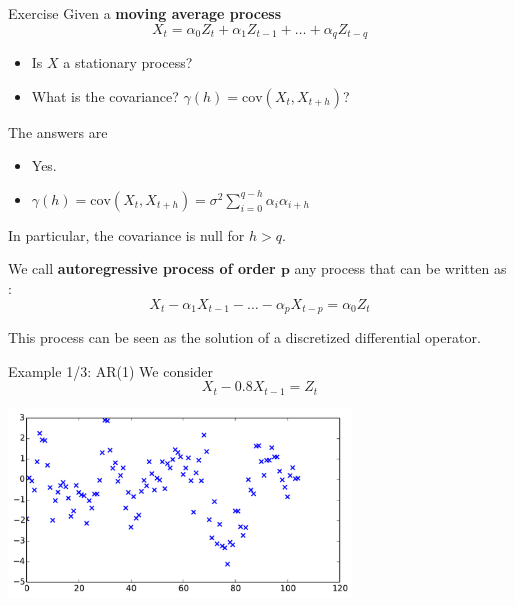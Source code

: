 \documentclass{beamer}
\begin{document}
\begin{frame}{}
\begin{exampleblock}{Exercise}
Given a \textbf{moving average process} 
\begin{equation*}
X_t  = \alpha_0 Z_{t} + \alpha_1 Z_{t-1} + \dots + \alpha_q Z_{t-q}
\end{equation*}
\begin{itemize}
	\item Is $X$ a stationary process?
	\item What is the covariance? $\gamma(h) = \mathrm{cov}(X_t,X_{t+h})$?
\end{itemize}
\end{exampleblock}
\pause
The answers are
\begin{itemize}
	\item Yes.
	\item $\gamma(h) = \mathrm{cov}(X_t,X_{t+h}) = \sigma^2 \sum_{i=0}^{q-h} \alpha_i \alpha_{i+h}$
\end{itemize}
\vspace{2mm}
In particular, the covariance is null for $h>q$.
\end{frame}

\begin{frame}{}
\begin{definition}
We call \textbf{autoregressive process of order $\mathbf{p}$} any process that can be written as :
\begin{equation*}
 X_t - \alpha_1 X_{t-1} - \dots - \alpha_p X_{t-p} = \alpha_0 Z_{t} 
\end{equation*}
\end{definition}
This process can be seen as the solution of a discretized differential operator.
\end{frame}

\begin{frame}{}
\begin{exampleblock}{Example 1/3: AR(1)}
We consider
\begin{equation*}
 X_t - 0.8 X_{t-1} = Z_{t} 
\end{equation*}
\end{exampleblock}
\begin{center}
\includegraphics[height=5cm]{figures/1_ar1a}
\end{center}
\end{frame}
\end{document}
